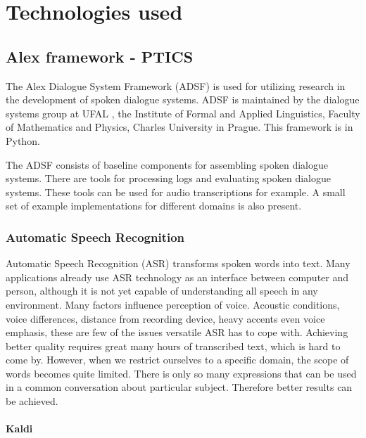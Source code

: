 \chapter{Technologies used}

\section{Alex framework - PTICS}

The Alex Dialogue System Framework (ADSF) is used for utilizing research in the development of spoken dialogue systems.
ADSF is maintained by the dialogue systems group at UFAL \cite{ufal}, the Institute of Formal and Applied Linguistics, Faculty of Mathematics and Physics, Charles University in Prague.
This framework is in Python.

The ADSF consists of baseline components for assembling spoken dialogue systems.
There are tools for processing logs and evaluating spoken dialogue systems.
These tools can be used for audio transcriptions for example.
A small set of example implementations for different domains is also present.


\subsection{Automatic Speech Recognition}

Automatic Speech Recognition (ASR) transforms spoken words into text.
Many applications already use ASR technology as an interface between computer and person, although it is not yet capable of understanding all speech in any environment.
Many factors influence perception of voice. Acoustic conditions, voice differences, distance from recording device, heavy accents even voice emphasis, these are few of the issues versatile ASR has to cope with.
Achieving better quality requires great many hours of transcribed text, which is hard to come by.
However, when we restrict ourselves to a specific domain, the scope of words becomes quite limited.
There is only so many expressions that can be used in a common conversation about particular subject.
Therefore better results can be achieved.


\subsubsection{Kaldi}

